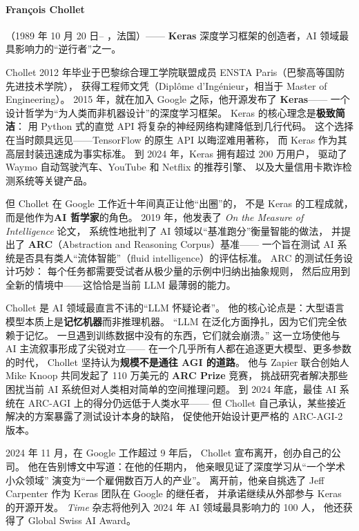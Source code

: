 \paragraph{François Chollet}（1989 年 10 月 20 日-- ，法国）——
\textbf{Keras} 深度学习框架的创造者，AI 领域最具影响力的``逆行者''之一。

Chollet 2012 年毕业于巴黎综合理工学院联盟成员
ENSTA Paris（巴黎高等国防先进技术学院），
获得工程师文凭（Diplôme d'Ingénieur，相当于 Master of Engineering）。
2015 年，就在加入 Google 之际，他开源发布了 \textbf{Keras}——
一个设计哲学为``为人类而非机器设计''的深度学习框架。
Keras 的核心理念是\textbf{极致简洁}：
用 Python 式的直觉 API 将复杂的神经网络构建降低到几行代码。
这个选择在当时颇具远见——TensorFlow 的原生 API 以晦涩难用著称，
而 Keras 作为其高层封装迅速成为事实标准。
到 2024 年，Keras 拥有超过 200 万用户，
驱动了 Waymo 自动驾驶汽车、YouTube 和 Netflix 的推荐引擎、
以及大量信用卡欺诈检测系统等关键产品。

但 Chollet 在 Google 工作近十年间真正让他``出圈''的，
不是 Keras 的工程成就，而是他作为\textbf{AI 哲学家}的角色。
2019 年，他发表了 \textit{On the Measure of Intelligence} 论文，
系统性地批判了 AI 领域以``基准跑分''衡量智能的做法，
并提出了 \textbf{ARC}（Abstraction and Reasoning Corpus）基准——
一个旨在测试 AI 系统是否具有类人``流体智能''（fluid intelligence）的评估标准。
ARC 的测试任务设计巧妙：
每个任务都需要受试者从极少量的示例中归纳出抽象规则，
然后应用到全新的情境中——这恰恰是当前 LLM 最薄弱的能力。

\begin{whybox}
Chollet 是 AI 领域最直言不讳的``LLM 怀疑论者''。
他的核心论点是：大型语言模型本质上是\textbf{记忆机器}而非推理机器。
``LLM 在泛化方面挣扎，因为它们完全依赖于记忆。
一旦遇到训练数据中没有的东西，它们就会崩溃。''
这一立场使他与 AI 主流叙事形成了尖锐对立——
在一个几乎所有人都在追逐更大模型、更多参数的时代，
Chollet 坚持认为\textbf{规模不是通往 AGI 的道路}。
他与 Zapier 联合创始人 Mike Knoop 共同发起了
110 万美元的 \textbf{ARC Prize} 竞赛，
挑战研究者解决那些困扰当前 AI 系统但对人类相对简单的空间推理问题。
到 2024 年底，最佳 AI 系统在 ARC-AGI 上的得分仍远低于人类水平——
但 Chollet 自己承认，某些接近解决的方案暴露了测试设计本身的缺陷，
促使他开始设计更严格的 ARC-AGI-2 版本。
\end{whybox}

2024 年 11 月，在 Google 工作超过 9 年后，
Chollet 宣布离开，创办自己的公司。
他在告别博文中写道：在他的任期内，
他亲眼见证了深度学习从``一个学术小众领域''
演变为``一个雇佣数百万人的产业''。
离开前，他亲自挑选了 Jeff Carpenter 作为 Keras 团队在 Google 的继任者，
并承诺继续从外部参与 Keras 的开源开发。
\textit{Time} 杂志将他列入 2024 年 AI 领域最具影响力的 100 人，
他还获得了 Global Swiss AI Award。



